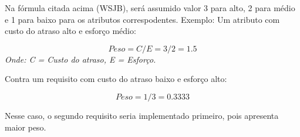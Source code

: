 Na fórmula citada acima (WSJB), será assumido valor 3 para alto, 2 para médio e 1 para baixo para os atributos correspodentes. Exemplo: Um atributo com custo do atraso alto e esforço médio:

\begin{equation}
  Peso = C / E = 3/2 = 1.5
\end{equation}
  \emph{Onde: C = Custo do atraso, E = Esforço.}

Contra um requisito com custo do atraso baixo e esforço alto:

\begin{equation}
  Peso = 1/3 = 0.3333
\end{equation}

Nesse caso, o segundo requisito seria implementado primeiro, pois apresenta maior peso.
